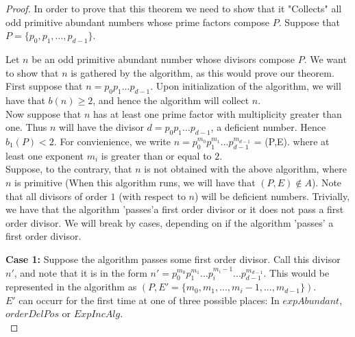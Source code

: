 \documentclass[../paper.tex]{subfiles}
\begin{document}
\begin{proof}
  In order to prove that this theorem we need to show that it
"Collects" all odd primitive abundant numbers whose prime factors
compose $P$. Suppose that $P = \{p_0, p_1, ..., p_{d-1}\}$.

  Let $n$ be an odd primitive abundant number whose divisors
compose $P$. We want to show that $n$ is gathered by the
algorithm, as this would prove our theorem.
\\

  First suppose that $n = p_0 p_1 ... p_{d-1}$. Upon
initialization of the algorithm, we will have that $b(n) \geq 2$,
and hence the algorithm will collect $n$.
\\

  Now suppose that $n$ has at least one prime factor with
multiplicity greater than one. Thus $n$ will have the divisor 
$d = p_0 p_1 ... p_{d-1}$, a deficient number. Hence
$b_1(P) < 2$. For convienience, we write $n = p_0^{m_0} p_1^{m_1} ...
p_{d-1}^{m_{d-1}}$ = (P,E). where at least one exponent
$m_i$ is greater than or equal to $2$.
\\

  Suppose, to the contrary, that $n$ is not obtained with the above 
algorithm, where $n$ is primitive (When this algorithm runs, we 
will have that $(P,E) \notin A$). Note that all divisors of order
$1$ (with respect to $n$) will be deficient numbers. Trivially, 
we have that the algorithm 'passes'\footnotemark a first order 
divisor or it does not pass a first order divisor. We will break 
by cases, depending on if the algorithm 'passes' a first order 
divisor.
\\


\textbf{Case 1:}
  Suppose the algorithm passes some first order divisor. Call
this divisor $n'$, and note that it is in the form $n'= p_0^{m_0}
p_1^{m_1} ... p_i^{m_i - 1} ... p_{d-1}^{m_{d-1}}$. This would be
represented in the algorithm as $(P, E' = \{m_0, m_1, ..., m_i - 1,
..., m_{d - 1 }\})$. 
\\

  $E'$ can occurr for the first time at one of three possible 
places: In $expAbundant$, $orderDelPos$ or $ExpIncAlg$.
\\


\end{proof}
\end{document}
